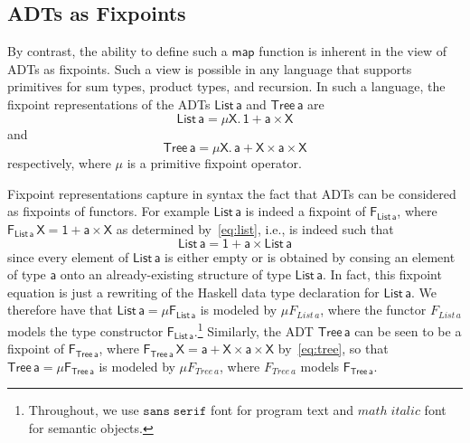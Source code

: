 \documentclass[submission,copyright,creativecommons]{eptcs}
\begin{document}

\subsection{ADTs as Fixpoints} 

By contrast, the ability to define such a $\mathsf{map}$ function is
inherent in the view of ADTs as fixpoints. Such a view is possible in
any language that supports primitives for sum types, product types,
and recursion. In such a language, the fixpoint representations of
  the ADTs $\mathsf{List\,a}$ and $\mathsf{Tree\,a}$ are
\begin{equation}\label{eq:list}
  \mathsf{List\,a} = \mathsf{\mu X.\, 1 + a \times X}
\end{equation}
and 
\begin{equation}\label{eq:tree}
  \mathsf{Tree\,a} = \mathsf{\mu X.\, a + X \times a \times X}
\end{equation}
respectively, where $\mathsf{\mu}$ is a primitive fixpoint operator.

Fixpoint representations capture in syntax the fact that ADTs can be
considered as fixpoints of functors. For example $\mathsf{List\,a}$ is
indeed a fixpoint of $\mathsf{F_{List\,a}}$, where
$\mathsf{F_{List\,a}\,X} = \mathsf{1 + a \times X}$ as determined
by~\eqref{eq:list}, i.e., is indeed such that
\[\mathsf{List\,a} = \mathsf{1 + a \times List\,a}\] 
since every element of $\mathsf{List\,a}$ is either empty or is
obtained by consing an element of type $\mathsf{a}$ onto an
already-existing structure of type $\mathsf{List\,a}$. In fact, this
fixpoint equation is just a rewriting of the Haskell data type
declaration for $\mathsf{List\,a}$. We therefore have that
$\mathsf{List\, a} = \mathsf{\mu F_{List\,a}}$ is modeled by $\mu
F_{\mathit{List}\,a}$, where the functor $F_{\mathit{List}\,a}$ models
the type constructor $\mathsf{F_{List\,a}}$.\footnote{Throughout, we
  use $\mathtt{sans\; serif}$ font for program text and $\mathit{math
    \; italic}$ font for semantic objects.}  Similarly, the ADT
$\mathsf{Tree\,a}$ can be seen to be a fixpoint of
$\mathsf{F_{Tree\,a}}$, where $\mathsf{F_{Tree\,a}\,X} = \mathsf{a + X
  \times a \times X}$ by~\eqref{eq:tree}, so that $\mathsf{Tree\, a} =
\mathsf{ \mu F_{Tree\,a}}$ is modeled by $\mu F_{\mathit{Tree}\,a}$,
where $F_{\mathit{Tree}\,a} $ models $\mathsf{F_{Tree\,a}}$.
 
\end{document}
